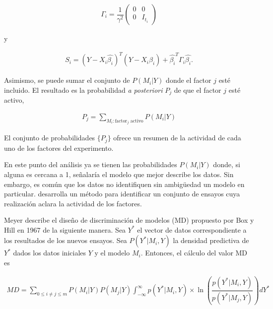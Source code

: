 \begin{equation} \label{gamma_i}
	\begin{aligned}
		\Gamma_i = \dfrac{1}{\gamma^{2}} 
		\begin{pmatrix}
			0 & 0 \\
			0 & I_{t_i}
		\end{pmatrix} 
	\end{aligned}
\end{equation}

y 

\begin{equation} \label{delta_i}
	\begin{aligned}
		S_i = (Y - X_i \hat{\beta_i})^{T} (Y - X_i \hat{\beta_i}) + \hat{\beta_i}^{T} \Gamma_i \hat{\beta_i}.
	\end{aligned}
\end{equation}

Asimismo, se puede sumar el conjunto de $P(M_i | Y)$ donde el factor $j$ esté incluido. El resultado es la probabilidad \textit{a posteriori}  $P_j$ de que el factor $j$ esté activo, 

\begin{equation} \label{eq_pj}
	\begin{aligned}
		P_j = \sum_{M_i:\text{factor}_{j}\text{ activo}} P(M_i | Y)
	\end{aligned}
\end{equation}

\noindent El conjunto de probabilidades $\{ P_j \}$ ofrece un resumen de la actividad de cada uno de los factores del experimento. 

En este punto del análisis ya se tienen las probabilidades $P(M_i | Y)$ donde, si alguna es cercana a 1, señalaría el modelo que mejor describe los datos. Sin embargo, es común que los datos no identifiquen sin ambigüedad un modelo en particular. \cite{meyer1996} desarrolla un método para identificar un conjunto de ensayos cuya realización aclara la actividad de los factores. 

Meyer describe el diseño de discriminación de modelos (MD) propuesto por Box y Hill en 1967 de la siguiente manera. Sea $Y^{*}$ el vector de datos correspondiente a los resultados de los nuevos ensayos. Sea $P(Y^{*}| M_i, Y)$ la densidad predictiva de $Y^{*}$ dados los datos iniciales $Y$ y el modelo $M_i$. Entonces, el cálculo del valor MD es

\begin{equation*}
	\begin{aligned}
		MD = \sum_{0 \leq i \neq j \leq m} P(M_i | Y) P(M_j | Y) \int_{-\infty}^{\infty} p(Y^{*} | M_i, Y) \times \ln(\dfrac{p(Y^{*} | M_i, Y)}{p(Y^{*} | M_j, Y)}) dY^{*}
	\end{aligned}
\end{equation*}

